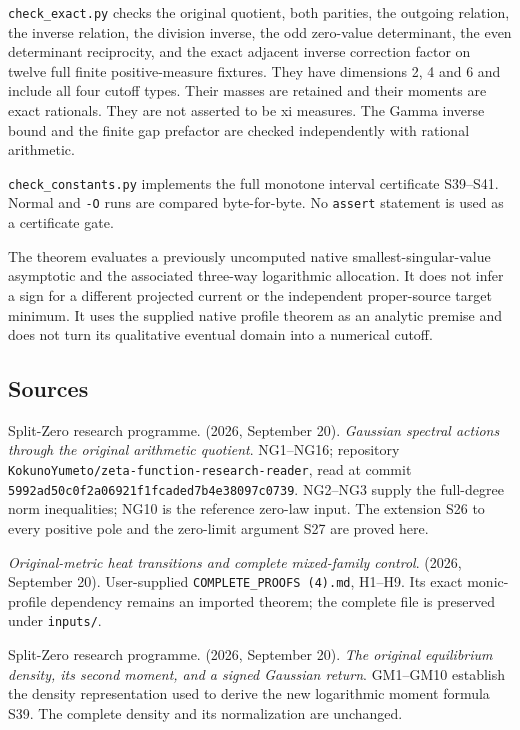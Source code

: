 \texttt{check\_exact.py} checks the original quotient, both parities, the outgoing relation, the inverse relation, the division inverse, the odd zero-value determinant, the even determinant reciprocity, and the exact adjacent inverse correction factor on twelve full finite positive-measure fixtures. They have dimensions 2, 4 and 6 and include all four cutoff types. Their masses are retained and their moments are exact rationals. They are not asserted to be xi measures. The Gamma inverse bound and the finite gap prefactor are checked independently with rational arithmetic.

\nolinkurl{check_constants.py} implements the full monotone interval certificate S39--S41. Normal and \texttt{-O} runs are compared byte-for-byte. No \texttt{assert} statement is used as a certificate gate.

The theorem evaluates a previously uncomputed native smallest-singular-value asymptotic and the associated three-way logarithmic allocation. It does not infer a sign for a different projected current or the independent proper-source target minimum. It uses the supplied native profile theorem as an analytic premise and does not turn its qualitative eventual domain into a numerical cutoff.

\subsection{Sources}\label{sources}

Split-Zero research programme. (2026, September 20). \emph{Gaussian spectral actions through the original arithmetic quotient}. NG1--NG16; repository \nolinkurl{KokunoYumeto/zeta-function-research-reader}, read at commit \nolinkurl{5992ad50c0f2a06921f1fcaded7b4e38097c0739}. NG2--NG3 supply the full-degree norm inequalities; NG10 is the reference zero-law input. The extension S26 to every positive pole and the zero-limit argument S27 are proved here.

\emph{Original-metric heat transitions and complete mixed-family control}. (2026, September 20). User-supplied \nolinkurl{COMPLETE_PROOFS (4).md}, H1--H9. Its exact monic-profile dependency remains an imported theorem; the complete file is preserved under \texttt{inputs/}.

Split-Zero research programme. (2026, September 20). \emph{The original equilibrium density, its second moment, and a signed Gaussian return}. GM1--GM10 establish the density representation used to derive the new logarithmic moment formula S39. The complete density and its normalization are unchanged.

